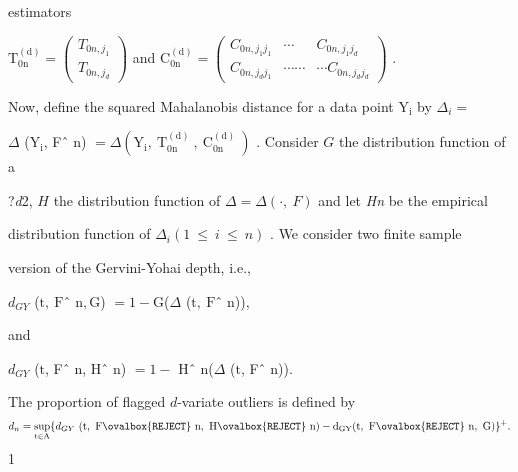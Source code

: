 \documentclass[a4paper,12pt]{article}
\begin{document}
estimators

$\mathrm{T}_{0\mathrm{n}}^{(\mathrm{d})}= \left(\begin{array}{l}
T_{0n,j_{1}}\\
T_{0n,j_{d}}
\end{array}\right)$ and $\mathrm{C}_{0\mathrm{n}}^{(\mathrm{d})}= \left(\begin{array}{lll}
C_{0n,j_{1}j_{1}} & \cdots & C_{0n,j_{1}j_{d}}\\
C_{0n,j_{d}j_{1}} & \cdots\cdots & \cdots C_{0n,j_{d}j_{d}}
\end{array}\right)$ .

Now, define the squared Mahalanobis distance for a data point $\mathrm{Y}_{\mathrm{i}}$ by $\Delta_{i}=$

$\Delta$ ($\mathrm{Y}_{\mathrm{i}}$, Fˆ n) $= \Delta(\mathrm{Y}_{\mathrm{i}},\ \mathrm{T}_{0\mathrm{n}}^{(\mathrm{d})}\ ,\ \mathrm{C}_{0\mathrm{n}}^{(\mathrm{d})}\ )$ . Consider $G$ the distribution function of a

?{\it d}2, $H$ the distribution function of $\Delta=\Delta(\cdot,\ F)$ and let {\it Hn} be the empirical

distribution function of $\Delta_{i} (1\ \leq\ i\ \leq\ n)$ . We consider two finite sample

version of the Gervini-Yohai depth, i.e.,
\begin{center}
$d_{GY}$ ($\mathrm{t},\ \mathrm{F}$ˆ $\mathrm{n}, \mathrm{G}$) $=1-\mathrm{G}$($\Delta$ ($\mathrm{t},\ \mathrm{F}$ˆ $\mathrm{n}$)),
\end{center}
and

$d_{GY}$ ($\mathrm{t}$, Fˆ $\mathrm{n}$, Hˆ $\mathrm{n}$) $=1-$ Hˆ $\mathrm{n}$($\Delta$ ($\mathrm{t}$, Fˆ $\mathrm{n}$)).

The proportion of flagged $d$-variate outliers is defined by
$$
d_{n}=\sup_{\mathrm{t}\in \mathrm{A}}\{d_{GY}\ (\mathrm{t},\ \mathrm{F}\ovalbox{\tt\small REJECT}\ \mathrm{n},\ \mathrm{H}\ovalbox{\tt\small REJECT}\ \mathrm{n})-\mathrm{d}_{\mathrm{G}\mathrm{Y}}(\mathrm{t},\ \mathrm{F}\ovalbox{\tt\small REJECT}\ \mathrm{n},\ \mathrm{G})\}^{+}.
$$
1
\end{document}
